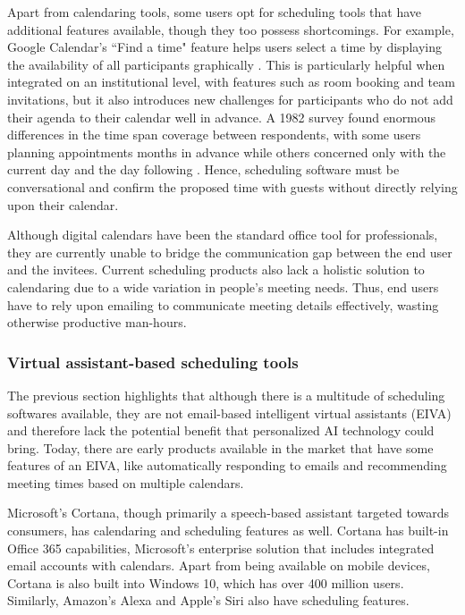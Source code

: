 \documentclass{article}
\begin{document}
Apart from calendaring tools, some users opt for scheduling tools that have additional features available, though they too possess shortcomings. For example, Google Calendar's ``Find a time" feature helps users select a time by displaying the availability of all participants graphically \cite{noauthor_google_2016}. This is particularly helpful when integrated on an institutional level, with features such as room booking and team invitations, but it also introduces new challenges for participants who do not add their agenda to their calendar well in advance. A 1982 survey found enormous differences in the time span coverage between respondents, with some users planning appointments months in advance while others concerned only with the current day and the day following \cite{kelley_how_1982}. Hence, scheduling software must be conversational and confirm the proposed time with guests without directly relying upon their calendar.

Although digital calendars have been the standard office tool for professionals, they are currently unable to bridge the communication gap between the end user and the invitees. Current scheduling products also lack a holistic solution to calendaring due to a wide variation in people's meeting needs. Thus, end users have to rely upon emailing to communicate meeting details effectively, wasting otherwise productive man-hours.

\subsubsection{Virtual assistant-based scheduling tools}

The previous section highlights that although there is a multitude of scheduling softwares available, they are not email-based intelligent virtual assistants (EIVA) and therefore lack the potential benefit that personalized AI technology could bring. Today, there are early products available in the market that have some features of an EIVA, like automatically responding to emails and recommending meeting times based on multiple calendars.

Microsoft's Cortana, though primarily a speech-based assistant targeted towards consumers, has calendaring and scheduling features as well. Cortana has built-in Office 365 capabilities, Microsoft's enterprise solution that includes integrated email accounts with calendars. Apart from being available on mobile devices, Cortana is also built into Windows 10, which has over 400 million users. Similarly, Amazon's Alexa and Apple's Siri also have scheduling features.
\end{document}
